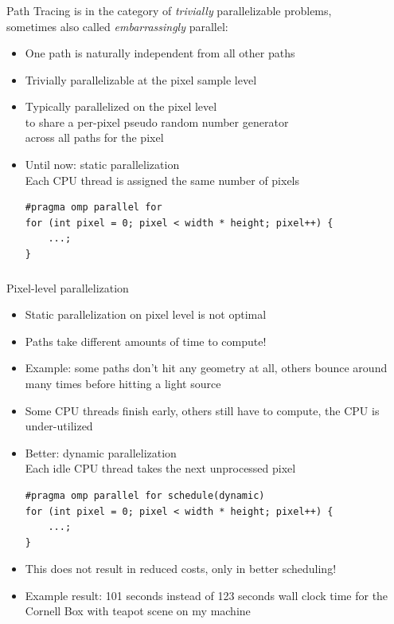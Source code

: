 \documentclass[utf8,stillsansserifmath,fleqn,t]{beamer}
\begin{document}
\begin{frame}[fragile]
\frametitle{\insertsection}
Path Tracing is in the category of \emph{trivially} parallelizable problems,\\
sometimes also called \emph{embarrassingly} parallel:
\begin{itemize}
\item One path is naturally independent from all other paths
\item Trivially parallelizable at the pixel sample level
\item Typically parallelized on the pixel level\\
    to share a per-pixel pseudo random number generator\\
    across all paths for the pixel
\item Until now: static parallelization\\
    Each CPU thread is assigned the same number of pixels
\begin{lstlisting}
#pragma omp parallel for
for (int pixel = 0; pixel < width * height; pixel++) {
    ...;
}
\end{lstlisting}
\end{itemize}
\end{frame}

\begin{frame}[fragile,label=parallelization-pixel]
\frametitle{\insertsection}
Pixel-level parallelization
\begin{itemize}
\item Static parallelization on pixel level is not optimal
\item Paths take different amounts of time to compute!
\item Example: some paths don't hit any geometry at all, others bounce around many
    times before hitting a light source
\item Some CPU threads finish early, others still have to compute, the CPU
is under-utilized
\item Better: dynamic parallelization\\
    Each idle CPU thread takes the next unprocessed pixel
\begin{lstlisting}
#pragma omp parallel for schedule(dynamic)
for (int pixel = 0; pixel < width * height; pixel++) {
    ...;
}
\end{lstlisting}
\item This does not result in reduced costs, only in better scheduling!
\item Example result: 101 seconds instead of 123 seconds wall clock time
for the Cornell Box with teapot scene on my machine
\end{itemize}
\end{frame}
\end{document}
